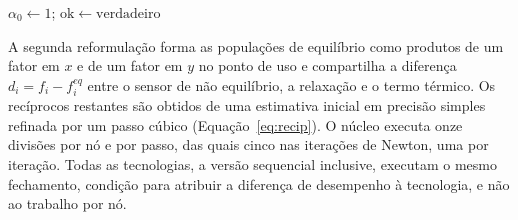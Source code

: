 \begin{algorithm}[H]
    \caption{Fechamento energético por eixo com o passo de Newton escalado}\label{alg:newton-escalado}
    $\alpha_0 \gets 1$; $\mathrm{ok} \gets \mathrm{verdadeiro}$\;
\end{algorithm}

A segunda reformulação forma as populações de equilíbrio como produtos de um fator em $x$ e de um fator em $y$ no ponto de uso e compartilha a diferença $d_i = f_i - f_i^{eq}$ entre o sensor de não equilíbrio, a relaxação e o termo térmico.
Os recíprocos restantes são obtidos de uma estimativa inicial em precisão simples refinada por um passo cúbico (Equação~\eqref{eq:recip}).
O núcleo executa onze divisões por nó e por passo, das quais cinco nas iterações de Newton, uma por iteração.
Todas as tecnologias, a versão sequencial inclusive, executam o mesmo fechamento, condição para atribuir a diferença de desempenho à tecnologia, e não ao trabalho por nó.

